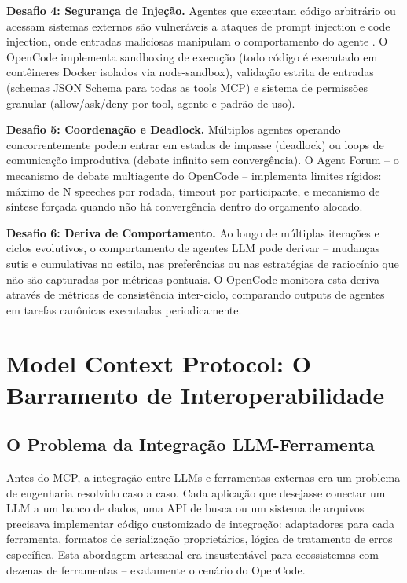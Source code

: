 \documentclass[12pt,a4paper,sumario=tradicional,openany]{abntex2}
\begin{document}
\textbf{Desafio 4: Segurança de Injeção.} Agentes que executam código arbitrário ou acessam sistemas externos são vulneráveis a ataques de prompt injection e code injection, onde entradas maliciosas manipulam o comportamento do agente \cite{bowers2025analyzing}. O OpenCode implementa sandboxing de execução (todo código é executado em contêineres Docker isolados via node-sandbox), validação estrita de entradas (schemas JSON Schema para todas as tools MCP) e sistema de permissões granular (allow/ask/deny por tool, agente e padrão de uso).

\textbf{Desafio 5: Coordenação e Deadlock.} Múltiplos agentes operando concorrentemente podem entrar em estados de impasse (deadlock) ou loops de comunicação improdutiva (debate infinito sem convergência). O Agent Forum -- o mecanismo de debate multiagente do OpenCode -- implementa limites rígidos: máximo de N speeches por rodada, timeout por participante, e mecanismo de síntese forçada quando não há convergência dentro do orçamento alocado.

\textbf{Desafio 6: Deriva de Comportamento.} Ao longo de múltiplas iterações e ciclos evolutivos, o comportamento de agentes LLM pode derivar -- mudanças sutis e cumulativas no estilo, nas preferências ou nas estratégias de raciocínio que não são capturadas por métricas pontuais. O OpenCode monitora esta deriva através de métricas de consistência inter-ciclo, comparando outputs de agentes em tarefas canônicas executadas periodicamente.

\section{Model Context Protocol: O Barramento de Interoperabilidade}

\subsection{O Problema da Integração LLM-Ferramenta}

Antes do MCP, a integração entre LLMs e ferramentas externas era um problema de engenharia resolvido caso a caso. Cada aplicação que desejasse conectar um LLM a um banco de dados, uma API de busca ou um sistema de arquivos precisava implementar código customizado de integração: adaptadores para cada ferramenta, formatos de serialização proprietários, lógica de tratamento de erros específica. Esta abordagem artesanal era insustentável para ecossistemas com dezenas de ferramentas -- exatamente o cenário do OpenCode.
\end{document}

